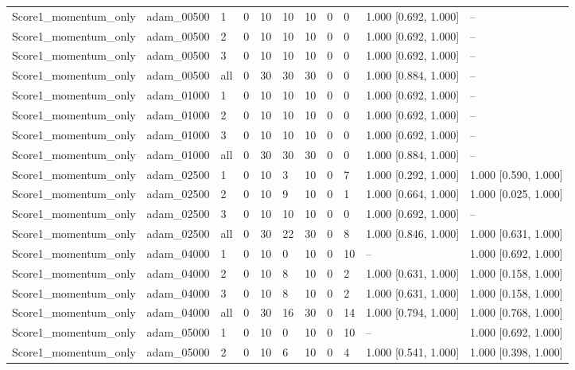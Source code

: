 \begin{longtable}{lllllllllll}
Score1\_momentum\_only & adam\_00500 & 1 & 0 & 10 & 10 & 10 & 0 & 0 & 1.000 [0.692, 1.000] & -- \\
Score1\_momentum\_only & adam\_00500 & 2 & 0 & 10 & 10 & 10 & 0 & 0 & 1.000 [0.692, 1.000] & -- \\
Score1\_momentum\_only & adam\_00500 & 3 & 0 & 10 & 10 & 10 & 0 & 0 & 1.000 [0.692, 1.000] & -- \\
Score1\_momentum\_only & adam\_00500 & all & 0 & 30 & 30 & 30 & 0 & 0 & 1.000 [0.884, 1.000] & -- \\
Score1\_momentum\_only & adam\_01000 & 1 & 0 & 10 & 10 & 10 & 0 & 0 & 1.000 [0.692, 1.000] & -- \\
Score1\_momentum\_only & adam\_01000 & 2 & 0 & 10 & 10 & 10 & 0 & 0 & 1.000 [0.692, 1.000] & -- \\
Score1\_momentum\_only & adam\_01000 & 3 & 0 & 10 & 10 & 10 & 0 & 0 & 1.000 [0.692, 1.000] & -- \\
Score1\_momentum\_only & adam\_01000 & all & 0 & 30 & 30 & 30 & 0 & 0 & 1.000 [0.884, 1.000] & -- \\
Score1\_momentum\_only & adam\_02500 & 1 & 0 & 10 & 3 & 10 & 0 & 7 & 1.000 [0.292, 1.000] & 1.000 [0.590, 1.000] \\
Score1\_momentum\_only & adam\_02500 & 2 & 0 & 10 & 9 & 10 & 0 & 1 & 1.000 [0.664, 1.000] & 1.000 [0.025, 1.000] \\
Score1\_momentum\_only & adam\_02500 & 3 & 0 & 10 & 10 & 10 & 0 & 0 & 1.000 [0.692, 1.000] & -- \\
Score1\_momentum\_only & adam\_02500 & all & 0 & 30 & 22 & 30 & 0 & 8 & 1.000 [0.846, 1.000] & 1.000 [0.631, 1.000] \\
Score1\_momentum\_only & adam\_04000 & 1 & 0 & 10 & 0 & 10 & 0 & 10 & -- & 1.000 [0.692, 1.000] \\
Score1\_momentum\_only & adam\_04000 & 2 & 0 & 10 & 8 & 10 & 0 & 2 & 1.000 [0.631, 1.000] & 1.000 [0.158, 1.000] \\
Score1\_momentum\_only & adam\_04000 & 3 & 0 & 10 & 8 & 10 & 0 & 2 & 1.000 [0.631, 1.000] & 1.000 [0.158, 1.000] \\
Score1\_momentum\_only & adam\_04000 & all & 0 & 30 & 16 & 30 & 0 & 14 & 1.000 [0.794, 1.000] & 1.000 [0.768, 1.000] \\
Score1\_momentum\_only & adam\_05000 & 1 & 0 & 10 & 0 & 10 & 0 & 10 & -- & 1.000 [0.692, 1.000] \\
Score1\_momentum\_only & adam\_05000 & 2 & 0 & 10 & 6 & 10 & 0 & 4 & 1.000 [0.541, 1.000] & 1.000 [0.398, 1.000] \\

\end{longtable}
